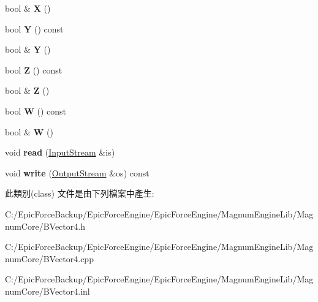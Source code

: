 \begin{DoxyCompactItemize}
\item 
bool \& {\bfseries X} ()\hypertarget{class_magnum_1_1_b_vector4_af6cf0a2f9c096e33cd46d64a4a4e5437}{}\label{class_magnum_1_1_b_vector4_af6cf0a2f9c096e33cd46d64a4a4e5437}

\item 
bool {\bfseries Y} () const \hypertarget{class_magnum_1_1_b_vector4_a1e7dfa671b8dde6bdf30600e0038de8f}{}\label{class_magnum_1_1_b_vector4_a1e7dfa671b8dde6bdf30600e0038de8f}

\item 
bool \& {\bfseries Y} ()\hypertarget{class_magnum_1_1_b_vector4_a5b43636222ccb3089591c1a7c5fc40de}{}\label{class_magnum_1_1_b_vector4_a5b43636222ccb3089591c1a7c5fc40de}

\item 
bool {\bfseries Z} () const \hypertarget{class_magnum_1_1_b_vector4_aad4108d839572750032c295d744fa8a6}{}\label{class_magnum_1_1_b_vector4_aad4108d839572750032c295d744fa8a6}

\item 
bool \& {\bfseries Z} ()\hypertarget{class_magnum_1_1_b_vector4_a22fab4e2813d4c2c9cb18fa089e93169}{}\label{class_magnum_1_1_b_vector4_a22fab4e2813d4c2c9cb18fa089e93169}

\item 
bool {\bfseries W} () const \hypertarget{class_magnum_1_1_b_vector4_a2e54b5bd9cb251c0c49d5cfb7429ffac}{}\label{class_magnum_1_1_b_vector4_a2e54b5bd9cb251c0c49d5cfb7429ffac}

\item 
bool \& {\bfseries W} ()\hypertarget{class_magnum_1_1_b_vector4_a04ee3ddd6aa03274036b9639f3012a66}{}\label{class_magnum_1_1_b_vector4_a04ee3ddd6aa03274036b9639f3012a66}

\item 
void {\bfseries read} (\hyperlink{class_magnum_1_1_input_stream}{Input\+Stream} \&is)\hypertarget{class_magnum_1_1_b_vector4_a29b81ee962fe4f977277cdede21adfe2}{}\label{class_magnum_1_1_b_vector4_a29b81ee962fe4f977277cdede21adfe2}

\item 
void {\bfseries write} (\hyperlink{class_magnum_1_1_output_stream}{Output\+Stream} \&os) const \hypertarget{class_magnum_1_1_b_vector4_a159a00a6762ee6edff35d0f037621161}{}\label{class_magnum_1_1_b_vector4_a159a00a6762ee6edff35d0f037621161}

\end{DoxyCompactItemize}


此類別(class) 文件是由下列檔案中產生\+:\begin{DoxyCompactItemize}
\item 
C\+:/\+Epic\+Force\+Backup/\+Epic\+Force\+Engine/\+Epic\+Force\+Engine/\+Magnum\+Engine\+Lib/\+Magnum\+Core/B\+Vector4.\+h\item 
C\+:/\+Epic\+Force\+Backup/\+Epic\+Force\+Engine/\+Epic\+Force\+Engine/\+Magnum\+Engine\+Lib/\+Magnum\+Core/B\+Vector4.\+cpp\item 
C\+:/\+Epic\+Force\+Backup/\+Epic\+Force\+Engine/\+Epic\+Force\+Engine/\+Magnum\+Engine\+Lib/\+Magnum\+Core/B\+Vector4.\+inl\end{DoxyCompactItemize}
